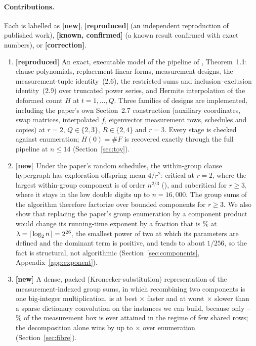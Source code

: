 \documentclass[11pt]{article}
\theoremstyle{definition}
\theoremstyle{remark}
\newcommand{\cnt}{\#F}
\newcommand{\new}{\textbf{[new]}}
\newcommand{\repro}{\textbf{[reproduced]}}
\newcommand{\known}{\textbf{[known, confirmed]}}
\newcommand{\corr}{\textbf{[correction]}}
\begin{document}
\paragraph{Contributions.} Each is labelled as \new{}, \repro{} (an independent reproduction of published work), \known{} (a known result confirmed with exact numbers), or \corr{}.
\begin{enumerate}[leftmargin=1.6em,itemsep=2pt]
\item \repro{} An exact, executable model of the pipeline of \citet{OpenAI26}, Theorem~1.1: clause polynomials, replacement linear forms, measurement designs, the measurement-tuple identity~(2.6), the restricted sums and inclusion--exclusion identity~(2.9) over truncated power series, and Hermite interpolation of the deformed count $H$ at $t = 1, \dots, Q$. Three families of designs are implemented, including the paper's own Section~2.7 construction (auxiliary coordinates, swap matrices, interpolated $f$, eigenvector measurement rows, schedules and copies) at $r = 2$, $Q \in \{2, 3\}$, $R \in \{2, 4\}$ and $r = 3$. Every stage is checked against enumeration; $H(0) = \cnt$ is recovered exactly through the full pipeline at $n \le 14$ (Section~\ref{sec:toy}).
\item \new{} Under the paper's random schedules, the within-group clause hypergraph has exploration offspring mean $4/r^2$: critical at $r = 2$, where the largest within-group component is of order $n^{2/3}$ (\compTwoThirds), and subcritical for $r \ge 3$, where it stays in the low double digits up to $n = 16{,}000$. The group sums of the algorithm therefore factorize over bounded components for $r \ge 3$. We also show that replacing the paper's group enumeration by a component product would change its running-time exponent by a fraction that is \expShareA\% at $\lambda = \lceil \log_2 n \rceil = 2^{26}$, the smallest power of two at which its parameters are defined and the dominant term is positive, and tends to about $1/256$, so the fact is structural, not algorithmic (Section~\ref{sec:components}, Appendix~\ref{app:exponent}).
\item \new{} A dense, packed (Kronecker-substitution) representation of the measurement-indexed group sums, in which recombining two components is one big-integer multiplication, is at best \fibreDictRatioMax$\times$ faster and at worst \fibrePackedOverDictMax$\times$ slower than a sparse dictionary convolution on the \fibreInstances{} instances we can build, because only \fibreDensityMin--\fibreDensityMax\% of the measurement box is ever attained in the regime of few shared rows; the decomposition alone wins by up to \fibreBestSubcritMax$\times$ over enumeration (Section~\ref{sec:fibre}).

\end{enumerate}
\end{document}
